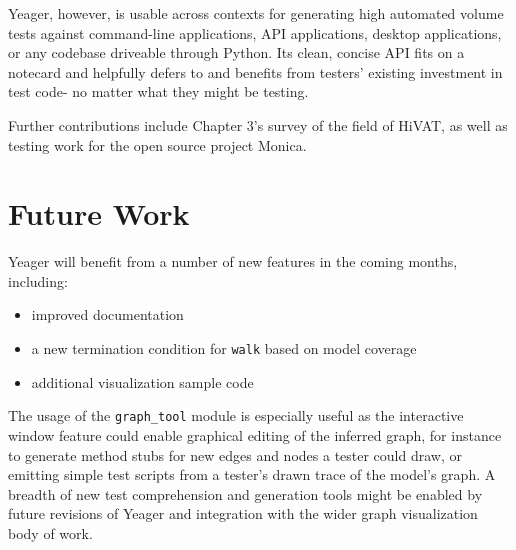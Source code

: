 Yeager, however, is usable across contexts for generating high automated volume tests against command-line applications, API applications, desktop applications, or any codebase driveable through Python. Its clean, concise API fits on a notecard and helpfully defers to and benefits from testers' existing investment in test code- no matter what they might be testing.

Further contributions include Chapter 3's survey of the field of HiVAT, as well as testing work for the open source project Monica.

\section{Future Work}
Yeager will benefit from a number of new features in the coming months, including:
\begin{itemize}
  \item improved documentation
  \item a new termination condition for \texttt{walk} based on model coverage
  \item additional visualization sample code
\end{itemize}

The usage of the \texttt{graph\_tool} module is especially useful as the interactive window feature could enable graphical editing of the inferred graph, for instance to generate method stubs for new edges and nodes a tester could draw, or emitting simple test scripts from a tester's drawn trace of the model's graph. A breadth of new test comprehension and generation tools might be enabled by future revisions of Yeager and integration with the wider graph visualization body of work.
